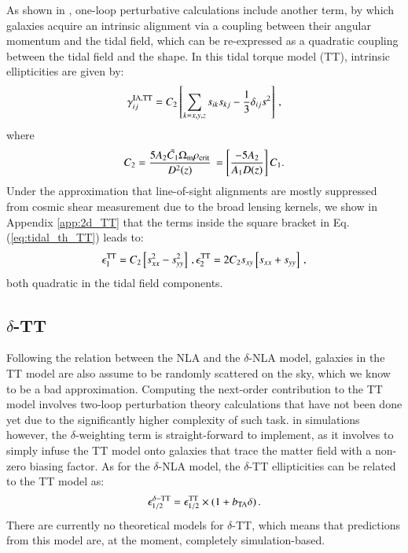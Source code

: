 \documentclass[useAMS,usenatbib]{mn2e}
\begin{document}
As shown in \citet{Blazek2019}, one-loop perturbative calculations include another term, by which galaxies acquire an intrinsic alignment via a coupling between their angular momentum and the tidal field, which can be re-expressed as a quadratic coupling between the tidal field and the shape. In this tidal torque model (TT), intrinsic ellipticities are given by:
\begin{eqnarray}
\gamma_{ij}^{\rm IA, TT} = C_2 \left[ \sum_{k=x,y,z} s_{ik} s_{kj} -\frac{1}{3} \delta_{ij} s^2 \right] \, ,
\label{eq:tidal_th_TT}
\end{eqnarray}
where 
\begin{eqnarray}
C_2 = \frac{5 A_2 \bar{C_1} \Omega_{\rm m} \rho_{\rm crit}}{D^2(z)} \,  = \left[ \frac{-5 A_2}{A_1 D(z)} \right] C_1.
\end{eqnarray}
Under the approximation that line-of-sight alignments are mostly suppressed from cosmic shear measurement due to the broad lensing kernels, 
we show in  Appendix \ref{app:2d_TT} that the terms inside the square bracket in Eq. (\ref{eq:tidal_th_TT}) leads to:
\begin{eqnarray}
\epsilon_1^{\rm TT} = C_2  \left[ s_{xx}^2 - s_{yy}^2\right] \, , \epsilon_2^{\rm TT} = 2 C_2 s_{xy}\left[s_{xx}+s_{yy}  \right]\, ,
\end{eqnarray}
both quadratic in the tidal field components.


\subsection{$\delta$-TT}
\label{subsec:IA_th_TT}

Following the relation between the NLA and the $\delta$-NLA model, galaxies in the TT model are also assume to be randomly scattered on the sky, which we know to be a bad approximation. Computing the next-order contribution to the TT model involves two-loop perturbation theory calculations that have not been done yet due to the significantly higher complexity of such task. in simulations however, the $\delta$-weighting term is straight-forward to implement, as it involves to simply infuse the TT model onto galaxies that trace the matter field with a non-zero biasing factor. As for the $\delta$-NLA model, the $\delta$-TT ellipticities can  be related to the TT model as:
\begin{eqnarray}
\epsilon_{1/2}^{\delta-\rm TT} = \epsilon_{1/2}^{\rm TT}\times(1 + b_{\rm TA}\delta) \, .
\label{eq:tidal_th_deltaTT}
\end{eqnarray}
 There are currently no theoretical models for $\delta$-TT, which means that predictions from this model are, at the moment, completely simulation-based. 
 
\end{document}
